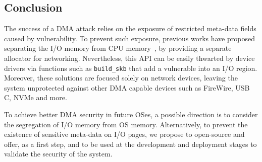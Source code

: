 \subsection{Conclusion}\label{sec:Conclusion}




The success of a DMA attack relies on the exposure of restricted meta-data fields caused by \subpage{} vulnerability. 
To prevent such exposure, previous works have proposed separating the I/O memory from CPU memory~\cite{MSMT18}, by providing a separate allocator for networking. 
Nevertheless, this API can be easily thwarted by device drivers via functions such as \texttt{build\_skb} that add a vulnerable \shinfo into an I/O region. 
Moreover, these solutions are focused solely on network devices, leaving the system unprotected against other DMA capable devices such as FireWire, USB C, NVMe and more.


To achieve better DMA security in future OSes, a possible direction is to consider the segregation of I/O memory from OS memory. 
Alternatively, to prevent the existence of sensitive meta-data on I/O pages, we propose to open-source and offer, as a first step, \tool{} and \dkasan{} to be used at the development and deployment stages to validate the security of the system. 



 




